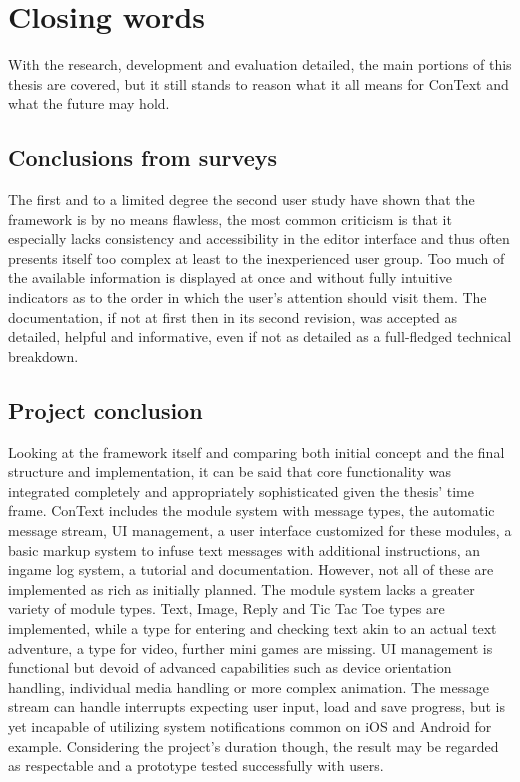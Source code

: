 
\chapter{Closing words}\label{chapter:outlook}
With the research, development and evaluation detailed, the main portions of this thesis are covered, but it still stands to reason what it all means for ConText and what the future may hold.
\section{Conclusions from surveys}
The first and to a limited degree the second user study have shown that the framework is by no means flawless, the most common criticism is that it especially lacks consistency and accessibility in the editor interface and thus often presents itself too complex at least to the inexperienced user group. Too much of the available information is displayed at once and without fully intuitive indicators as to the order in which the user's attention should visit them. 
The documentation, if not at first then in its second revision, was accepted as detailed, helpful and informative, even if not as detailed as a full-fledged technical breakdown. 
\section{Project conclusion}
Looking at the framework itself and comparing both initial concept and the final structure and implementation, it can be said that core functionality was integrated completely and appropriately sophisticated given the thesis' time frame. ConText includes the module system with message types, the automatic message stream, UI management, a user interface customized for these modules, a basic markup system to infuse text messages with additional instructions, an ingame log system, a tutorial and documentation.
However, not all of these are implemented as rich as initially planned.
The module system lacks a greater variety of module types. Text, Image, Reply and Tic Tac Toe types are implemented, while a type for entering and checking text akin to an actual text adventure, a type for video, further mini games are missing. 
UI management is functional but devoid of advanced capabilities such as device orientation handling, individual media handling or more complex animation. 
The message stream can handle interrupts expecting user input, load and save progress, but is yet incapable of utilizing system notifications common on iOS and Android for example. 
Considering the project's duration though, the result may be regarded as respectable and a prototype tested successfully with users. 
